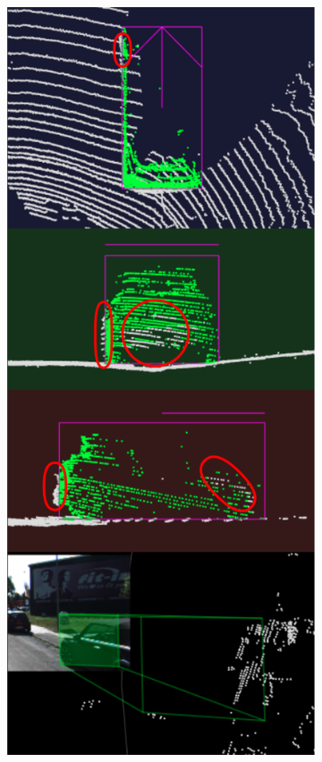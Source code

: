 \documentclass[letterpaper, 10 pt, conference]{ieeeconf}  %
\begin{document}
\begin{figure}
	~
	\begin{subfigure}{0.3\linewidth}
		\includegraphics[scale=0.2]{./figures/annocheck-1}
	\end{subfigure}
	~
	\begin{subfigure}{0.3\linewidth}

\end{subfigure}
\end{figure}
\end{document}
